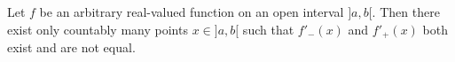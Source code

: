 Let $f$ be an arbitrary real-valued function on an open interval $]a, b[$. Then there exist only countably many points $x \in ]a, b[$ such that $f'_-(x)$ and $f'_+(x)$ both exist and are not equal.
